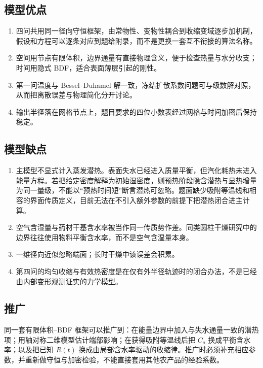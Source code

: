 \subsection{模型优点}

\begin{enumerate}
  \item 四问共用同一径向守恒框架，由常物性、变物性耦合到收缩变域逐步加机制，假设和方程可以逐条对应到题给附录，而不是更换一套互不衔接的算法名称。
  \item 空间用节点有限体积，边界通量有直接物理含义，便于检查热量与水分收支；时间用隐式 BDF，适合表面薄层引起的刚性。
  \item 第一问温度与 Bessel--Duhamel 解一致，冻结扩散系数问题可与级数解对照，从而把离散误差与物理简化分开讨论。
  \item 输出半径落在网格节点上，题目要求的四位小数表经过网格与时间加密后保持稳定。
\end{enumerate}

\subsection{模型缺点}

\begin{enumerate}
  \item 主模型不显式计入蒸发潜热。表面失水已经进入质量平衡，但汽化耗热未进入能量方程。若把给定密度解释为初始湿密度，则预热阶段隐含潜热与显热增量为同一量级，不能以``预热时间短''断言潜热可忽略\cite{dasilva2014}。题面缺少吸附等温线和相容的界面传质定义，目前无法在不引入额外参数的前提下把潜热闭合进主计算。
  \item 空气含湿量与药材干基含水率被当作同一传质势作差。同类圆柱干燥研究中的边界往往使用物料平衡含水率，而不是空气含湿量本身\cite{dasilva2014,kaya2007}。
  \item 一维径向近似忽略端面；长时干燥中该误差会积累。
  \item 第四问的均匀收缩与有效热密度是在仅有外半径轨迹时的闭合办法，不是已经由内部变形观测证实的力学模型。
\end{enumerate}

\subsection{推广}

同一套有限体积--BDF 框架可以推广到：在能量边界中加入与失水通量一致的潜热项；用轴对称二维模型估计端部影响；在获得吸附等温线后把 $C_a$ 换成平衡含水率；以及把已知 $R(t)$ 换成由局部含水率驱动的收缩律。推广时必须补充相应参数，并重新做守恒与加密检验，不能直接套用其他农产品的经验系数。
